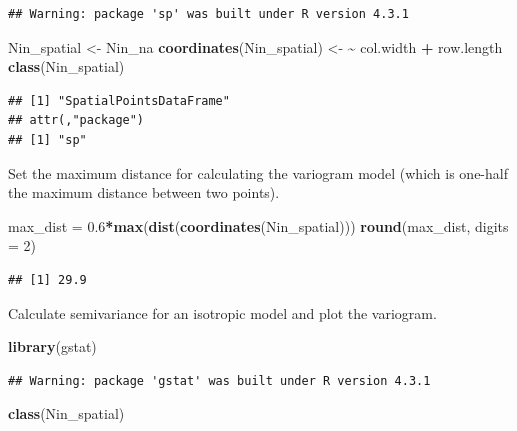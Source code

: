 \documentclass[
]{book}
\newenvironment{Shaded}{\begin{snugshade}}{\end{snugshade}}
\newcommand{\AttributeTok}[1]{\textcolor[rgb]{0.13,0.29,0.53}{#1}}
\newcommand{\DecValTok}[1]{\textcolor[rgb]{0.00,0.00,0.81}{#1}}
\newcommand{\ErrorTok}[1]{\textcolor[rgb]{0.64,0.00,0.00}{\textbf{#1}}}
\newcommand{\FloatTok}[1]{\textcolor[rgb]{0.00,0.00,0.81}{#1}}
\newcommand{\FunctionTok}[1]{\textcolor[rgb]{0.13,0.29,0.53}{\textbf{#1}}}
\newcommand{\NormalTok}[1]{#1}
\newcommand{\OtherTok}[1]{\textcolor[rgb]{0.56,0.35,0.01}{#1}}
\newcommand{\SpecialCharTok}[1]{\textcolor[rgb]{0.81,0.36,0.00}{\textbf{#1}}}
\begin{document}
\begin{verbatim}
## Warning: package 'sp' was built under R version 4.3.1
\end{verbatim}

\begin{Shaded}
\begin{Highlighting}[]
\NormalTok{Nin\_spatial }\OtherTok{\textless{}{-}}\NormalTok{ Nin\_na}
\FunctionTok{coordinates}\NormalTok{(Nin\_spatial) }\OtherTok{\textless{}{-}} \ErrorTok{\textasciitilde{}}\NormalTok{ col.width }\SpecialCharTok{+}\NormalTok{ row.length}
\FunctionTok{class}\NormalTok{(Nin\_spatial)}
\end{Highlighting}
\end{Shaded}

\begin{verbatim}
## [1] "SpatialPointsDataFrame"
## attr(,"package")
## [1] "sp"
\end{verbatim}

Set the maximum distance for calculating the variogram model (which is one-half the maximum distance between two points).

\begin{Shaded}
\begin{Highlighting}[]
\NormalTok{max\_dist }\OtherTok{=} \FloatTok{0.6}\SpecialCharTok{*}\FunctionTok{max}\NormalTok{(}\FunctionTok{dist}\NormalTok{(}\FunctionTok{coordinates}\NormalTok{(Nin\_spatial)))}
\FunctionTok{round}\NormalTok{(max\_dist, }\AttributeTok{digits =} \DecValTok{2}\NormalTok{)}
\end{Highlighting}
\end{Shaded}

\begin{verbatim}
## [1] 29.9
\end{verbatim}

Calculate semivariance for an isotropic model and plot the variogram.

\begin{Shaded}
\begin{Highlighting}[]
\FunctionTok{library}\NormalTok{(gstat)}
\end{Highlighting}
\end{Shaded}

\begin{verbatim}
## Warning: package 'gstat' was built under R version 4.3.1
\end{verbatim}

\begin{Shaded}
\begin{Highlighting}[]
\FunctionTok{class}\NormalTok{(Nin\_spatial)}
\end{Highlighting}
\end{Shaded}
\end{document}
